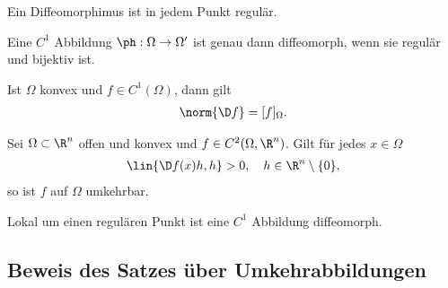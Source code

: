 \begin{prop}
Ein Diffeomorphimus ist in jedem Punkt regulär.
\end{prop}
\begin{prop}
Eine $C^1$ Abbildung $\ph: \Omega \to \Omega'$ ist genau dann diffeomorph, wenn
sie regulär und bijektiv ist.
\end{prop}
\begin{prop}
Ist $\Omega$ konvex und $f\in C^1(\Omega)$, dann gilt
\begin{align*}
\norm{\D f} = [f]_\Omega.
\end{align*}
\end{prop}
\begin{prop}
Sei $\Omega\subset\R^n$ offen und konvex und $f\in C^2(\Omega,\R^n)$. Gilt für
jedes $x\in\Omega$
\begin{align*}
\lin{\D f(x)h,h} > 0,\quad h\in \R^n\setminus\{0\},
\end{align*}
so ist $f$ auf $\Omega$ umkehrbar.
\end{prop}
\begin{prop}
Lokal um einen regulären Punkt ist eine $C^1$ Abbildung diffeomorph.
\end{prop}

\subsection{Beweis des Satzes über Umkehrabbildungen}

